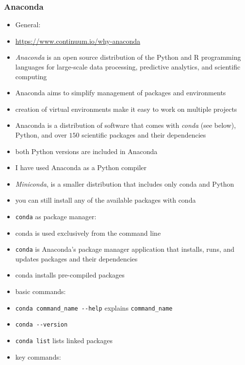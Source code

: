 \documentclass[onecolumn]{IEEEtran} %
\begin{document}
\subsubsection{Anaconda}
\begin{itemize}
    \item General:
    \bi
        \item \url{https://www.continuum.io/why-anaconda}
        \item \emph{Anaconda} is an open source distribution of the Python and R programming languages for large-scale data processing, predictive analytics, and scientific computing
        \item Anaconda aims to simplify management of packages and environments
        \bi
            \item creation of virtual environments make it easy to work on multiple projects
        \ei
        \item Anaconda is a distribution of software that comes with \emph{conda} (see below), Python, and over $150$ scientific packages and their dependencies
        \bi
            \item both Python versions are included in Anaconda
        \ei
        \item I have used Anaconda as a Python compiler
        \item \emph{Miniconda}, is a smaller distribution that includes only conda and Python
        \bi
            \item you can still install any of the available packages with conda
        \ei
    \ei
    \item \verb|conda| as package manager:
    \bi
        \item conda is used exclusively from the command line
        \item \verb|conda| is Anaconda's package manager application that installs, runs, and updates packages and their dependencies
        \bi
            \item conda installs pre-compiled packages
        \ei
        \item basic commands:
        \bi
             \item \verb|conda command_name --help| \newline explains \verb|command_name|
             \item \verb|conda --version|
             \item \verb|conda list| lists linked packages
        \ei
        \item key commands:

\end{itemize}
\end{document}
